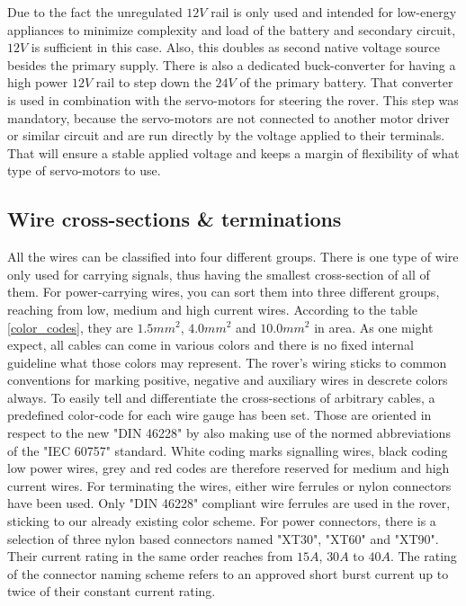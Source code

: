     Due to the fact the unregulated $12V$ rail is only used and intended for low-energy appliances to minimize complexity and load of the battery and secondary circuit, $12V$ is sufficient in this case. Also, this doubles as second native voltage source besides the primary supply. There is also a dedicated buck-converter for having a high power $12V$ rail to step down the $24V$ of the primary battery. That converter is used in combination with the servo-motors for steering the rover. This step was mandatory, because the servo-motors are not connected to another motor driver or similar circuit and are run directly by the voltage applied to their terminals. That will ensure a stable applied voltage and keeps a margin of flexibility of what type of servo-motors to use. 

    \clearpage %

    \subsection{Wire cross-sections \& terminations}

    All the wires can be classified into four different groups. There is one type of wire only used for carrying signals, thus having the smallest cross-section of all of them. For power-carrying wires, you can sort them into three different groups, reaching from low, medium and high current wires. According to the table \ref{color_codes}, they are $1.5mm^2$, $4.0mm^2$ and $10.0mm^2$ in area. As one might expect, all cables can come in various colors and there is no fixed internal guideline what those colors may represent. The rover's wiring sticks to common conventions for marking positive, negative and auxiliary wires in descrete colors always. To easily tell and differentiate the cross-sections of arbitrary cables, a predefined color-code for each wire gauge has been set. Those are oriented in respect to the new "DIN 46228" by also making use of the normed abbreviations of the "IEC 60757" standard. White coding marks signalling wires, black coding low power wires, grey and red codes are therefore reserved for medium and high current wires. For terminating the wires, either wire ferrules or nylon connectors have been used. Only "DIN 46228" compliant wire ferrules are used in the rover, sticking to our already existing color scheme. For power connectors, there is a selection of three nylon based connectors named "XT30", "XT60" and "XT90". Their current rating in the same order reaches from $15A$, $30A$ to $40A$. The rating of the connector naming scheme refers to an approved short burst current up to twice of their constant current rating.  

